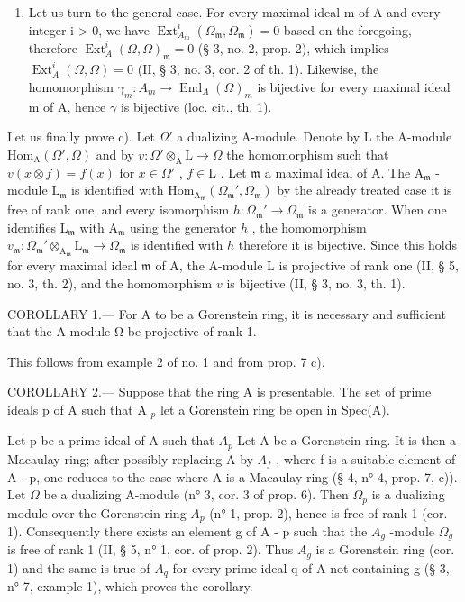 \begin{enumerate}
\def\labelenumi{\Alph{enumi})}
\setcounter{enumi}{1}
\tightlist
\item
  Let us turn to the general case. For every maximal ideal m of A and every integer i \textgreater{} 0, we have \(\operatorname{Ext}_{A_{m}}^{i}(\Omega_{\mathfrak{m}}, \Omega_{\mathfrak{m}}) = 0\) based on the foregoing, therefore \(\operatorname{Ext}_{A}^{i}(\Omega, \Omega)_{\mathfrak{m}} = 0\) (§ 3, no. 2, prop. 2), which implies \(\operatorname{Ext}_{A}^{i}(\Omega, \Omega) = 0\) (II, § 3, no. 3, cor. 2 of th. 1). Likewise, the homomorphism \(\gamma_{m}: A_{m} \to \operatorname{End}_{A}(\Omega)_{m}\) is bijective for every maximal ideal m of A, hence \(\gamma\) is bijective (loc. cit., th. 1).
\end{enumerate}

Let us finally prove c). Let \(\Omega'\) a dualizing A-module. Denote by L the A-module \(\mathrm{Hom}_{\mathrm{A}}(\Omega',\Omega)\) and by \(v:\Omega' \otimes_{\mathrm{A}} \mathrm{L} \longrightarrow \Omega\) the homomorphism such that \(v(x \otimes f) = f(x)\) for \(x \in \Omega'\) , \(f \in \mathrm{L}\) . Let \(\mathfrak{m}\) a maximal ideal of A. The \(\mathrm{A}_{\mathfrak{m}}\) -module \(\mathrm{L}_{\mathfrak{m}}\) is identified with \(\mathrm{Hom}_{\mathrm{A}_{\mathfrak{m}}}(\Omega_{\mathfrak{m}}',\Omega_{\mathfrak{m}})\) by the already treated case it is free of rank one, and every isomorphism \(h:\Omega_{\mathfrak{m}}' \to \Omega_{\mathfrak{m}}\) is a generator. When one identifies \(\mathrm{L}_{\mathfrak{m}}\) with \(\mathrm{A}_{\mathfrak{m}}\) using the generator \(h\) , the homomorphism \(v_{\mathfrak{m}}:\Omega_{\mathfrak{m}}' \otimes_{\mathrm{A}_{\mathfrak{m}}}\mathrm{L}_{\mathfrak{m}} \longrightarrow \Omega_{\mathfrak{m}}\) is identified with \(h\) therefore it is bijective. Since this holds for every maximal ideal \(\mathfrak{m}\) of A, the A-module L is projective of rank one (II, § 5, no. 3, th. 2), and the homomorphism \(v\) is bijective (II, § 3, no. 3, th. 1).

COROLLARY 1.--- For A to be a Gorenstein ring, it is necessary and sufficient that the A-module Ω be projective of rank 1.

This follows from example 2 of no. 1 and from prop. 7 c).

COROLLARY 2.--- Suppose that the ring A is presentable. The set of prime ideals p of A such that A \(_{p}\) let a Gorenstein ring be open in Spec(A).

Let p be a prime ideal of A such that \(A_{p}\) Let A be a Gorenstein ring. It is then a Macaulay ring; after possibly replacing A by \(A_{f}\) , where f is a suitable element of A - p, one reduces to the case where A is a Macaulay ring (§ 4, n° 4, prop. 7, c)). Let \(\Omega\) be a dualizing A-module (n° 3, cor. 3 of prop. 6). Then \(\Omega_{p}\) is a dualizing module over the Gorenstein ring \(A_{p}\) (n° 1, prop. 2), hence is free of rank 1 (cor. 1). Consequently there exists an element g of A - p such that the \(A_{g}\) -module \(\Omega_{g}\) is free of rank 1 (II, § 5, n° 1, cor. of prop. 2). Thus \(A_{g}\) is a Gorenstein ring (cor. 1) and the same is true of \(A_{q}\) for every prime ideal q of A not containing g (§ 3, n° 7, example 1), which proves the corollary.

